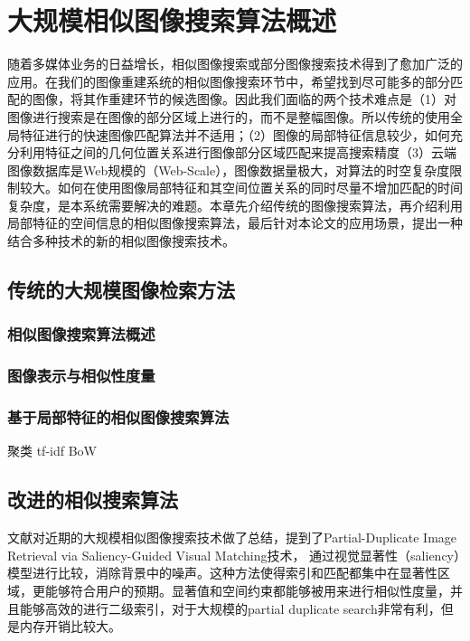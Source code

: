 

\chapter{大规模相似图像搜索算法概述}

随着多媒体业务的日益增长，相似图像搜索或部分图像搜索技术得到了愈加广泛的应用。在我们的图像重建系统的相似图像搜索环节中，希望找到尽可能多的部分匹配的图像，将其作重建环节的候选图像。因此我们面临的两个技术难点是（1）对图像进行搜索是在图像的部分区域上进行的，而不是整幅图像。所以传统的使用全局特征进行的快速图像匹配算法并不适用；（2）图像的局部特征信息较少，如何充分利用特征之间的几何位置关系进行图像部分区域匹配来提高搜索精度（3）云端图像数据库是Web规模的（Web-Scale），图像数据量极大，对算法的时空复杂度限制较大。如何在使用图像局部特征和其空间位置关系的同时尽量不增加匹配的时间复杂度，是本系统需要解决的难题。本章先介绍传统的图像搜索算法，再介绍利用局部特征的空间信息的相似图像搜索算法，最后针对本论文的应用场景，提出一种结合多种技术的新的相似图像搜索技术。

\section{传统的大规模图像检索方法}

\subsection{相似图像搜索算法概述}

\subsection{图像表示与相似性度量}

\subsection{基于局部特征的相似图像搜索算法}
聚类
tf-idf
BoW

\section{改进的相似搜索算法}
文献\cite{POLICY:2013te}对近期的大规模相似图像搜索技术做了总结，提到了Partial-Duplicate Image Retrieval via Saliency-Guided Visual Matching\cite{Li:2013ks}技术，
通过视觉显著性（saliency）模型进行比较，消除背景中的噪声。这种方法使得索引和匹配都集中在显著性区域，更能够符合用户的预期。显著值和空间约束都能够被用来进行相似性度量，并且能够高效的进行二级索引，对于大规模的partial duplicate search非常有利，但是内存开销比较大。

